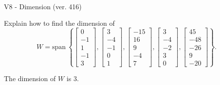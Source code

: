 \begin{exercise}
  \begin{exerciseTitle}V8 - Dimension (ver. 416)\end{exerciseTitle}
  \begin{exerciseStatement}
    Explain how to find the dimension of 
\[W=\mathrm{span}\ \left\{\left[\begin{array}{r}
0 \\
-1 \\
1 \\
-1 \\
3
\end{array}\right] , \left[\begin{array}{r}
3 \\
-4 \\
-1 \\
0 \\
1
\end{array}\right] , \left[\begin{array}{r}
-15 \\
16 \\
9 \\
-4 \\
7
\end{array}\right] , \left[\begin{array}{r}
3 \\
-4 \\
-2 \\
3 \\
0
\end{array}\right] , \left[\begin{array}{r}
45 \\
-48 \\
-26 \\
9 \\
-20
\end{array}\right]\right\}.\]



  \end{exerciseStatement}
  \begin{exerciseAnswer}
   The dimension of \(W\) is  \(3\).
  


  \end{exerciseAnswer}
\end{exercise}